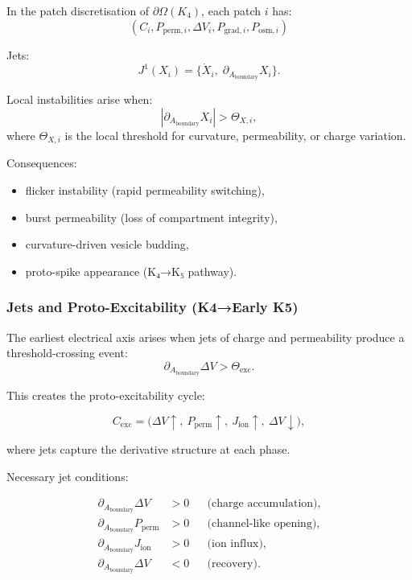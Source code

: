 In the patch discretisation of $\partial\Omega(K_4)$, each patch $i$ has:
\[
(C_i, P_{\mathrm{perm},i}, \Delta V_i, P_{\mathrm{grad},i}, P_{\mathrm{osm},i})
\]

Jets:
\[
J^1(X_i)=\bigl\{\dot{X}_i,\;\partial_{A_{\mathrm{boundary}}}X_i\bigr\}.
\]

Local instabilities arise when:
\[
|\partial_{A_{\mathrm{boundary}}}X_i| > \Theta_{X,i},
\]
where $\Theta_{X,i}$ is the local threshold for curvature, permeability,
or charge variation.

Consequences:

\begin{itemize}
    \item flicker instability (rapid permeability switching),
    \item burst permeability (loss of compartment integrity),
    \item curvature-driven vesicle budding,
    \item proto-spike appearance (K₄→K₅ pathway).
\end{itemize}


\subsubsection{Jets and Proto-Excitability (K4→Early K5)}

The earliest electrical axis arises when jets of charge and permeability
produce a threshold-crossing event:
\[
\partial_{A_{\mathrm{boundary}}}\Delta V > \Theta_{\mathrm{exc}}.
\]

This creates the proto-excitability cycle:

\[
C_{\mathrm{exc}} =
\bigl(
\Delta V \uparrow,\
P_{\mathrm{perm}} \uparrow,\
J_{\mathrm{ion}} \uparrow,\
\Delta V \downarrow
\bigr),
\]

where jets capture the derivative structure at each phase.

Necessary jet conditions:

\begin{align*}
\partial_{A_{\mathrm{boundary}}}\Delta V &> 0
&&\text{(charge accumulation)},\\
\partial_{A_{\mathrm{boundary}}}P_{\mathrm{perm}} &> 0
&&\text{(channel-like opening)},\\
\partial_{A_{\mathrm{boundary}}}J_{\mathrm{ion}} &> 0
&&\text{(ion influx)},\\
\partial_{A_{\mathrm{boundary}}}\Delta V &< 0
&&\text{(recovery)}.
\end{align*}

